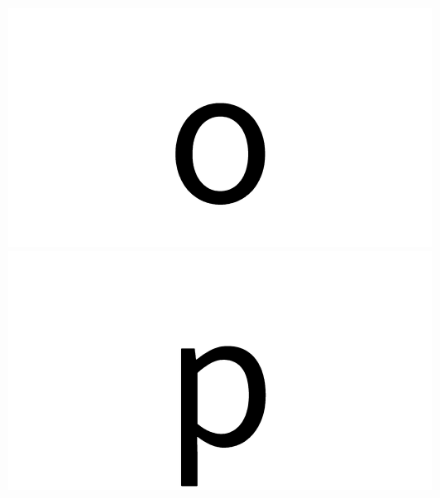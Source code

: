 \documentclass{article}
\begin{document}
\begin{figure}[H]
  \includegraphics[width=\linewidth]{o}
\endminipage\hfill
{}
  \includegraphics[width=\linewidth]{p}
\endminipage\hfill
\end{figure}
\end{document}
